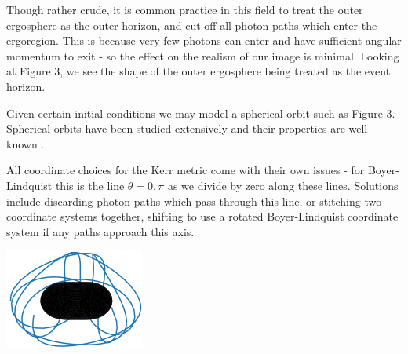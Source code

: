 \documentclass[landscape,a2paper,fontscale=1]{baposter} %
\begin{document}
\begin{poster}
{\vspace{1em}
Though rather crude, it is common practice in this field to treat the outer ergosphere as the outer horizon, and cut off all photon paths which enter the ergoregion. This is because very few photons can enter and have sufficient angular momentum to exit - so the effect on the realism of our image is minimal. Looking at Figure 3, we see the shape of the outer ergosphere being treated as the event horizon.

\vspace{1em}
Given certain initial conditions we may model a spherical orbit such as Figure 3. Spherical orbits have been studied extensively and their properties are well known \cite{teo2003spherical}.

\vspace{1em}
All coordinate choices for the Kerr metric come with their own issues - for Boyer-Lindquist this is the line $\theta = 0,\pi$ as we divide by zero along these lines. Solutions include discarding photon paths which pass through this line, or stitching two coordinate systems together, shifting to use a rotated Boyer-Lindquist coordinate system if any paths approach this axis.

\begin{center}
\includegraphics[width=0.4\linewidth]{3d-kerr-plot}
\end{center}
}



\end{poster}
\end{document}

